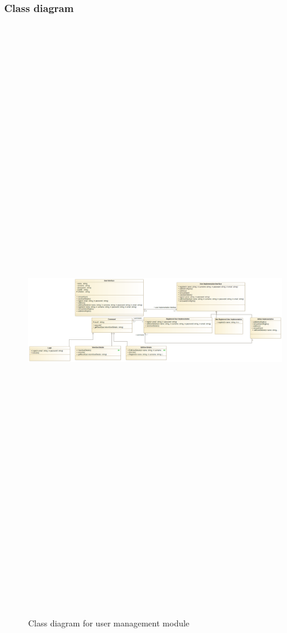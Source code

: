 \subsubsection{Class diagram}
\begin{figure}[H]
	\includegraphics[width=12cm,height=26cm,keepaspectratio]{Users/Pictures/User_Class_Diagram.png}
	\caption{Class diagram for user management module}\label{visina8}
\end{figure}
